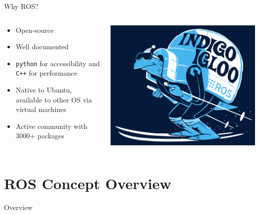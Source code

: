 \documentclass{beamer}
\begin{document}
\begin{frame}{Why ROS?}
\begin{columns}
	\begin{column}{0.55\textwidth}
		\begin{itemize}
			\item Open-source
			\item Well documented
			\item \alert{\texttt{python}} for accessibility and \alert{\texttt{C++}} for performance 
			\item Native to \alert{Ubuntu}, available to other OS via virtual machines
			\item Active community with \alert{3000+} packages
		\end{itemize}
	\end{column}
	\begin{column}{0.45\textwidth}
		\centering
		\includegraphics[width=\textwidth]{fig/indigoigloo_600.png}
	\end{column}
\end{columns}

\end{frame}

\section{ROS Concept Overview}
\begin{frame}[label=overview]{Overview}
	\tableofcontents[sectionstyle=show/shaded,subsectionstyle=show/shaded/shaded]
\end{frame}
\end{document}
